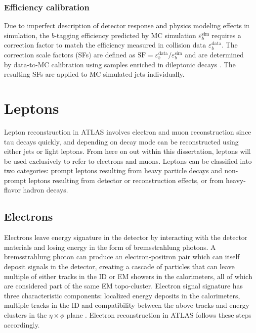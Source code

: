 \documentclass[../thesis.tex]{subfiles}
\begin{document}
\subsubsection*{Efficiency calibration}
Due to imperfect description of detector response and physics modeling effects in simulation, the $b$-tagging efficiency predicted by \acs{MC} simulation $\varepsilon_b^\mathrm{sim}$ requires a correction factor to match the efficiency measured in collision data $\varepsilon_b^\mathrm{data}$. The correction scale factors (\acs{SF}s) are defined as $\mathrm{SF}=\varepsilon_b^\mathrm{data}/\varepsilon_b^\mathrm{sim}$ and are determined by data-to-\acs{MC} calibration using samples enriched in dileptonic \ttbar decays \citep{ftag:calib}. The resulting \acs{SF}s are applied to \acs{MC} simulated jets individually.


\section{Leptons}
Lepton reconstruction in ATLAS involves electron and muon reconstruction since tau decays quickly, and depending on decay mode can be reconstructed using either jets or light leptons. From here on out within this dissertation, leptons will be used exclusively to refer to electrons and muons. Leptons can be classified into two categories: prompt leptons resulting from heavy particle decays and non-prompt leptons resulting from detector or reconstruction effects, or from heavy-flavor hadron decays.

\subsection{Electrons}
\label{sec:electron}
Electrons leave energy signature in the detector by interacting with the detector materials and losing energy in the form of bremsstrahlung photons. A bremsstrahlung photon can produce an electron-positron pair which can itself deposit signals in the detector, creating a cascade of particles that can leave multiple of either tracks in the \acs{ID} or \acs{EM} showers in the calorimeters, all of which are considered part of the same \acs{EM} topo-cluster. Electron signal signature has three characteristic components: localized energy deposits in the calorimeters, multiple tracks in the \acs{ID} and compatibility between the above tracks and energy clusters in the $\eta \times \phi$ plane \citep{reco:electron_id}. Electron reconstruction in ATLAS follows these steps accordingly.
\end{document}
